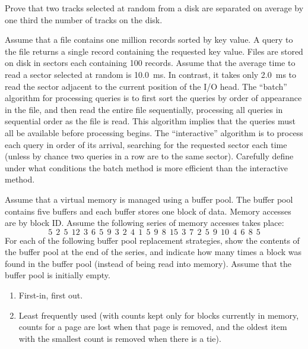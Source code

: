\begin{exercises}
\item
Prove that two tracks selected at random from a disk are separated on
average by one third the number of tracks on the disk.

\item
Assume that a file contains one million records sorted by key value.
A query to the file returns a single record containing the requested
key value.
Files are stored on disk in sectors each containing 100 records.
Assume that the average time to read a sector selected at random is
10.0~ms.
In contrast, it takes only 2.0~ms to read the sector adjacent to the
current position of the I/O head.
The ``batch'' algorithm for processing queries is to first sort the
queries by order of appearance in the file, and then read the entire
file sequentially, processing all queries in sequential order as the
file is read.
This algorithm implies that the queries must all be available before
processing begins.
The ``interactive'' algorithm is to process each query in order of its
arrival, searching for the requested sector each time (unless by
chance two queries in a row are to the same sector).
Carefully define under what conditions the batch method is more
efficient than the interactive method.

\item
Assume that a virtual memory
is managed using a buffer pool.
The buffer pool contains five buffers and each buffer stores one block
of data.
Memory accesses are by block ID.
Assume the following series of memory accesses takes place:
\[ 5\ \ 2\ \ 5\ \ 12\ \ 3\ \ 6\ \ 5\ \ 9\ \ 3\ \ 2\ \ 4\ \ 1\ \ 5\ \
9\ \ 8\ \ 15\ \ 3\ \ 7\ \ 2\ \ 5\ \ 9\ \ 10\ \ 4\ \ 6\ \ 8\ \ 5 \]
For each of the following buffer pool replacement strategies, show the
contents of the buffer pool at the end of the series, and indicate how
many times a block was found in the buffer pool (instead of being read
into memory).
Assume that the buffer pool is initially empty.

\begin{enumerate}
\item
First-in, first out.

\item
Least frequently used (with counts kept only for blocks currently in
memory, counts for a page are lost when that page is removed, and the
oldest item with the smallest count is removed when
there is a tie).


\end{enumerate}
\end{exercises}

